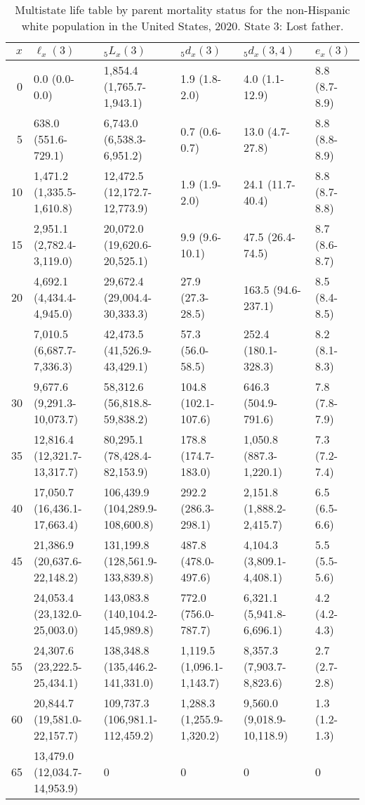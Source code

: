 \begin{table}

\caption{Multistate life table by parent mortality status for the non-Hispanic white population in the United States, 2020. State 3: Lost father.}
\centering
\begin{tabular}[t]{rlllll}
\toprule
$x$ & $\ell_x(3)$ & ${}_5 L_x(3)$ & ${}_5 d_x(3)$ & ${}_5 d_x(3,4)$ & $e_x(3)$\\
\midrule
0 & 0.0 (0.0-0.0) & 1,854.4 (1,765.7-1,943.1) & 1.9 (1.8-2.0) & 4.0 (1.1-12.9) & 8.8 (8.7-8.9)\\
5 & 638.0 (551.6-729.1) & 6,743.0 (6,538.3-6,951.2) & 0.7 (0.6-0.7) & 13.0 (4.7-27.8) & 8.8 (8.8-8.9)\\
10 & 1,471.2 (1,335.5-1,610.8) & 12,472.5 (12,172.7-12,773.9) & 1.9 (1.9-2.0) & 24.1 (11.7-40.4) & 8.8 (8.7-8.8)\\
15 & 2,951.1 (2,782.4-3,119.0) & 20,072.0 (19,620.6-20,525.1) & 9.9 (9.6-10.1) & 47.5 (26.4-74.5) & 8.7 (8.6-8.7)\\
20 & 4,692.1 (4,434.4-4,945.0) & 29,672.4 (29,004.4-30,333.3) & 27.9 (27.3-28.5) & 163.5 (94.6-237.1) & 8.5 (8.4-8.5)\\
\addlinespace
25 & 7,010.5 (6,687.7-7,336.3) & 42,473.5 (41,526.9-43,429.1) & 57.3 (56.0-58.5) & 252.4 (180.1-328.3) & 8.2 (8.1-8.3)\\
30 & 9,677.6 (9,291.3-10,073.7) & 58,312.6 (56,818.8-59,838.2) & 104.8 (102.1-107.6) & 646.3 (504.9-791.6) & 7.8 (7.8-7.9)\\
35 & 12,816.4 (12,321.7-13,317.7) & 80,295.1 (78,428.4-82,153.9) & 178.8 (174.7-183.0) & 1,050.8 (887.3-1,220.1) & 7.3 (7.2-7.4)\\
40 & 17,050.7 (16,436.1-17,663.4) & 106,439.9 (104,289.9-108,600.8) & 292.2 (286.3-298.1) & 2,151.8 (1,888.2-2,415.7) & 6.5 (6.5-6.6)\\
45 & 21,386.9 (20,637.6-22,148.2) & 131,199.8 (128,561.9-133,839.8) & 487.8 (478.0-497.6) & 4,104.3 (3,809.1-4,408.1) & 5.5 (5.5-5.6)\\
\addlinespace
50 & 24,053.4 (23,132.0-25,003.0) & 143,083.8 (140,104.2-145,989.8) & 772.0 (756.0-787.7) & 6,321.1 (5,941.8-6,696.1) & 4.2 (4.2-4.3)\\
55 & 24,307.6 (23,222.5-25,434.1) & 138,348.8 (135,446.2-141,331.0) & 1,119.5 (1,096.1-1,143.7) & 8,357.3 (7,903.7-8,823.6) & 2.7 (2.7-2.8)\\
60 & 20,844.7 (19,581.0-22,157.7) & 109,737.3 (106,981.1-112,459.2) & 1,288.3 (1,255.9-1,320.2) & 9,560.0 (9,018.9-10,118.9) & 1.3 (1.2-1.3)\\
65 & 13,479.0 (12,034.7-14,953.9) & 0 & 0 & 0 & 0\\
\bottomrule
\end{tabular}
\end{table}